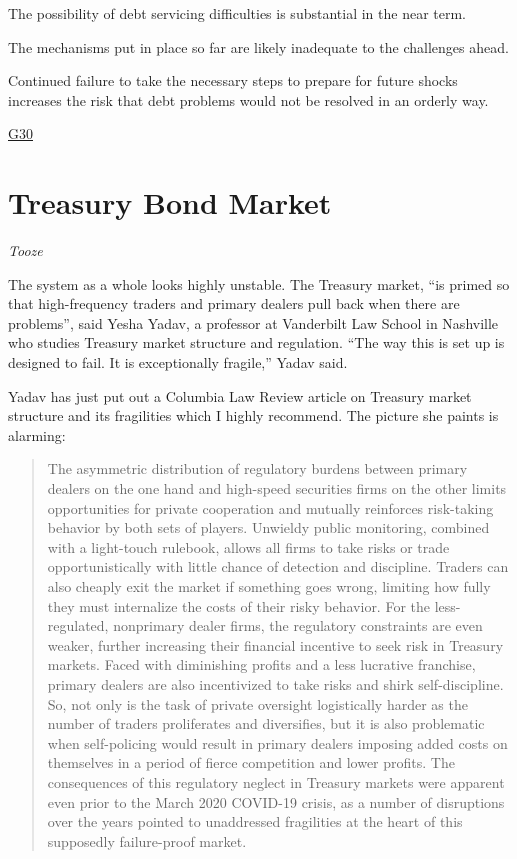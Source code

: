 \documentclass[
]{book}
\begin{document}
The possibility of debt servicing difficulties is substantial in the near term.

The mechanisms put in place so far are likely inadequate to the challenges ahead.

Continued failure to take the necessary steps to prepare for future shocks increases the risk that debt problems would not be resolved in an orderly way.

\href{https://group30.org/publications/detail/4915}{G30}

\hypertarget{treasury-bond-market}{%
\section{Treasury Bond Market}\label{treasury-bond-market}}

\emph{Tooze}

The system as a whole looks highly unstable. The Treasury market, ``is primed so that high-frequency traders and primary dealers pull back when there are problems'', said Yesha Yadav, a professor at Vanderbilt Law School in Nashville who studies Treasury market structure and regulation. ``The way this is set up is designed to fail. It is exceptionally fragile,'' Yadav said.

Yadav has just put out a Columbia Law Review article on Treasury market structure and its fragilities which I highly recommend. The picture she paints is alarming:

\begin{quote}
The asymmetric distribution of regulatory burdens between primary dealers on the one hand and high-speed securities firms on the other limits opportunities for private cooperation and mutually reinforces risk-taking behavior by both sets of players. Unwieldy public monitoring, combined with a light-touch rulebook, allows all firms to take risks or trade opportunistically with little chance of detection and discipline. Traders can also cheaply exit the market if something goes wrong, limiting how fully they must internalize the costs of their risky behavior. For the less-regulated, nonprimary dealer firms, the regulatory constraints are even weaker, further increasing their financial incentive to seek risk in Treasury markets. Faced with diminishing profits and a less lucrative franchise, primary dealers are also incentivized to take risks and shirk self-discipline. So, not only is the task of private oversight logistically harder as the number of traders proliferates and diversifies, but it is also problematic when self-policing would result in primary dealers imposing added costs on themselves in a period of fierce competition and lower profits. The consequences of this regulatory neglect in Treasury markets were apparent even prior to the March 2020 COVID-19 crisis, as a number of disruptions over the years pointed to unaddressed fragilities at the heart of this supposedly failure-proof market.
\end{quote}
\end{document}
